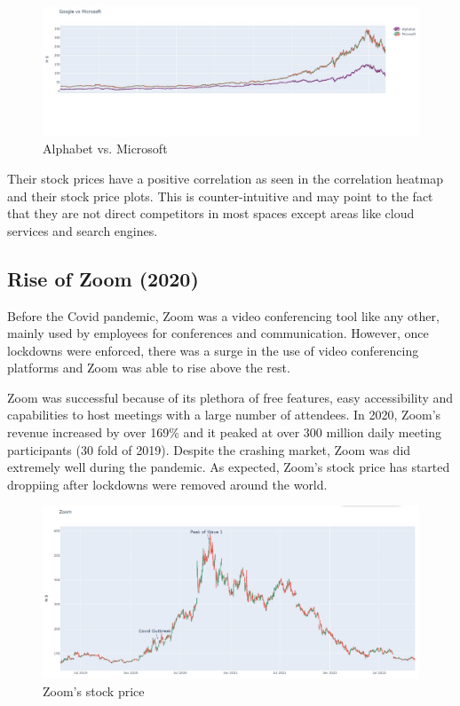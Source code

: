\documentclass[11pt, twocolumn]{article}
\begin{document}
\begin{justify}
\begin{figure}[h]
  \centering
  \includegraphics[scale=0.24]{figs/msgoogle.jpg}
  \caption*{Alphabet vs. Microsoft}
\end{figure}

Their stock prices have a positive correlation as seen in the correlation heatmap and their stock price plots. This is counter-intuitive and may point to the fact that they are not
direct competitors in most spaces except areas like cloud services and search engines.
\vspace{-5pt}

\subsection{Rise of Zoom (2020)}
Before the Covid pandemic, Zoom was a video conferencing tool like any other, mainly used by employees for conferences and communication. However, once lockdowns were enforced, there was a surge in the use of video conferencing platforms and Zoom was able to rise above the rest.
\vspace{1em}


Zoom was successful because of its plethora of free features, easy accessibility and capabilities to host meetings with a large number of attendees. In 2020, Zoom's revenue increased by over 169\%
and it peaked at over 300 million daily meeting participants (30 fold of 2019). Despite the crashing market, Zoom was did extremely well during the pandemic. As expected, Zoom's stock price has started droppiing after lockdowns were removed around the world.
\vspace{-5pt}

\begin{figure}[h]
  \centering
  \includegraphics[scale=0.25]{figs/zoom.jpg}
  \caption*{Zoom's stock price}
\end{figure}


\end{justify}
\end{document}
